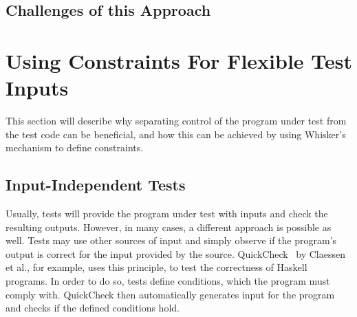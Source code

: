 \section{Challenges of this Approach}

%
%

\chapter{Using Constraints For Flexible Test Inputs}%
\label{cha:using_constraints_to_enable_flexible_test_inputs}

This section will describe why separating control of the program under test from the test code can be beneficial,
and how this can be achieved by using Whisker's  mechanism to define constraints.

\section{Input-Independent Tests}

Usually, tests will provide the program under test with inputs and check the resulting outputs.
However, in many cases, a different approach is possible as well.
Tests may use other sources of input and simply observe if the program's output is correct for the input provided by the source.
QuickCheck~\cite{quickcheck} by Claessen et al., for example, uses this principle, to test the correctness of Haskell programs.
In order to do so, tests define conditions, which the program must comply with.
QuickCheck then automatically generates input for the program and checks if the defined conditions hold.
\parspace

